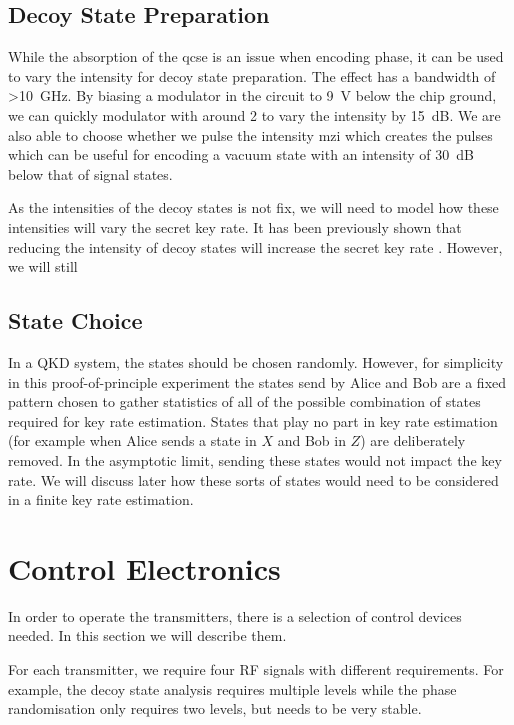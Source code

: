\subsection{Decoy State Preparation}

While the absorption of the \ac{qcse} is an issue when encoding phase, it can be used to vary the intensity for decoy state preparation. The effect has a bandwidth of \SI{>10}{\GHz}. By biasing a modulator in the circuit to \SI{9}{\V} below the chip ground, we can quickly modulator with around \SI{2}{\Vpp} to vary the intensity by \SI{15}{dB}. We are also able to choose whether we pulse the intensity \ac{mzi} which creates the pulses which can be useful for encoding a vacuum state with an intensity of \SI{30}{dB} below that of signal states.

As the intensities of the decoy states is not fix, we will need to model how these intensities will vary the secret key rate. It has been previously shown that reducing the intensity of decoy states will increase the secret key rate \cite{Chan2014}. However, we will still 

\subsection{State Choice}

In a \ac{QKD} system, the states should be chosen randomly. However, for simplicity in this proof-of-principle experiment the states send by Alice and Bob are a fixed pattern chosen to gather statistics of all of the possible combination of states required for key rate estimation. States that play no part in key rate estimation (for example when Alice sends a state in $X$ and Bob in $Z$) are deliberately removed. In the asymptotic limit, sending these states would not impact the key rate. We will discuss later how these sorts of states would need to be considered in a finite key rate estimation.

\section{Control Electronics}

In order to operate the transmitters, there is a selection of control devices needed. In this section we will describe them.

For each transmitter, we require four RF signals with different requirements. For example, the decoy state analysis requires multiple levels while the phase randomisation only requires two levels, but needs to be very stable.

